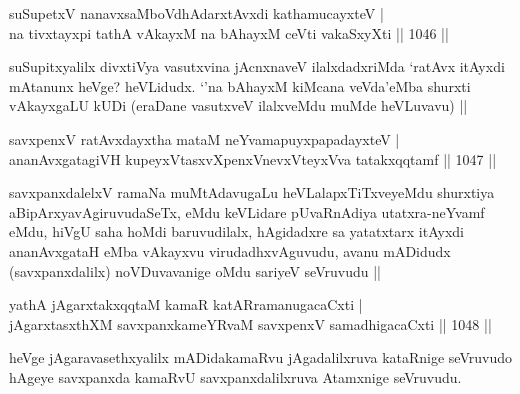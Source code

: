 
\begin{shl}
suSupetxV nanavxsaMboVdhAdarxtAvxdi kathamucayxteV | \\
na tivxtayxpi tathA vAkayxM na bAhayxM ceVti vakaSxyXti \hfill||  1046 ||  
\end{shl}

\begin{artha}
suSupitxyalilx divxtiVya vasutxvina jAcnxnaveV ilalxdadxriMda `ratAvx itAyxdi mAtanunx heVge? heVLidudx. `\stext'na bAhayxM kiMcana veVda'eMba shurxti vAkayxgaLU kUDi (eraDane vasutxveV ilalxveMdu muMde heVLuvavu) ||
\end{artha}


\begin{shl}
savxpenxV ratAvxdayxtha mataM neYvamapuyxpapadayxteV | \\
ananAvxgatagiVH kupeyxVtasxvXpenxV\s nevxVteyxVva tatakxqqtamf \hfill||  1047 ||  
\end{shl}

\begin{artha}
savxpanxdalelxV ramaNa muMtAdavugaLu heVLalapxTiTxveyeMdu shurxtiya aBipArxyavAgiruvudaSeTx, eMdu keVLidare pUvaRnAdiya utatxra-neYvamf eMdu, hiVgU saha hoMdi baruvudilalx, hAgidadxre sa yatatxtarx itAyxdi ananAvxgataH eMba vAkayxvu virudadhxvAguvudu, avanu mADidudx (savxpanxdalilx) noVDuvavanige oMdu sariyeV seVruvudu ||                                       
\end{artha}

\begin{shl}
yathA jAgarxtakxqqtaM kamaR katARramanugacaCxti | \\
jAgarxtasxthXM savxpanxkameYRvaM savxpenxV samadhigacaCxti \hfill||  1048 ||  
\end{shl}


\begin{artha}
heVge jAgaravasethxyalilx mADidakamaRvu jAgadalilxruva kataRnige seVruvudo hAgeye savxpanxda kamaRvU savxpanxdalilxruva Atamxnige seVruvudu.
\end{artha}


